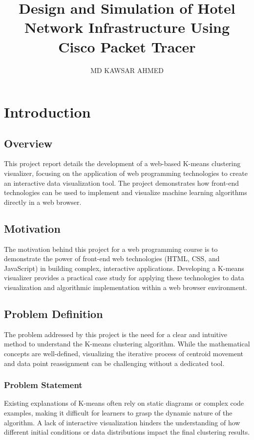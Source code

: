 \documentclass[12pt]{report}
\title{Design and Simulation of  Hotel Network Infrastructure Using Cisco Packet Tracer
}
\author{\textup{MD KAWSAR AHMED}}
\begin{document}
    
    \tableofcontents

\chapter{Introduction}

\section{Overview}
This project report details the development of a web-based K-means clustering visualizer, focusing on the application of web programming technologies to create an interactive data visualization tool. The project demonstrates how front-end technologies can be used to implement and visualize machine learning algorithms directly in a web browser.

\section{Motivation}
The motivation behind this project for a web programming course is to demonstrate the power of front-end web technologies (HTML, CSS, and JavaScript) in building complex, interactive applications. Developing a K-means visualizer provides a practical case study for applying these technologies to data visualization and algorithmic implementation within a web browser environment.

\section{Problem Definition}
The problem addressed by this project is the need for a clear and intuitive method to understand the K-means clustering algorithm. While the mathematical concepts are well-defined, visualizing the iterative process of centroid movement and data point reassignment can be challenging without a dedicated tool.

\subsection{Problem Statement}
Existing explanations of K-means often rely on static diagrams or complex code examples, making it difficult for learners to grasp the dynamic nature of the algorithm. A lack of interactive visualization hinders the understanding of how different initial conditions or data distributions impact the final clustering results.
\end{document}
